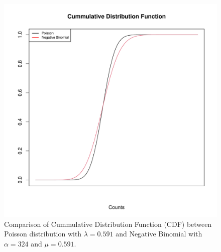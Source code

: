 \begin{figure}
\begin{knitrout}
\color{fgcolor}

{\centering \includegraphics[width=\textwidth-3cm]{figure/ch02_figunnamed-chunk-8-1} 

}


\end{knitrout}
  \caption{Comparison of Cummulative Distribution Function (CDF) between Poisson distribution with $\lambda = 0.591$ and Negative Binomial with $\alpha = 324$ and $\mu = 0.591$.}
  \label{fig:2_7}
\end{figure}



